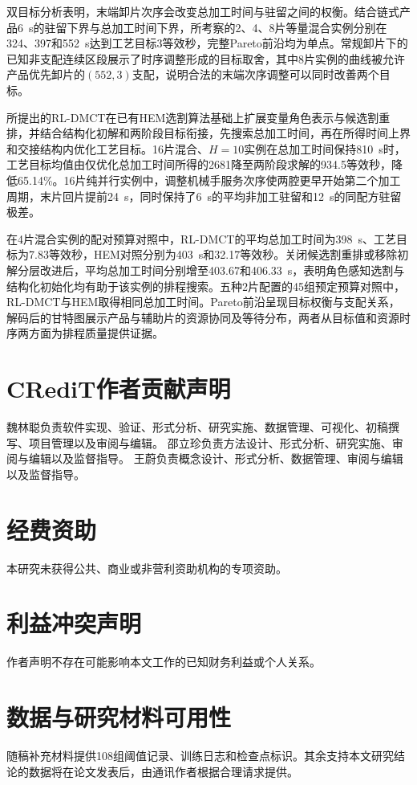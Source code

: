 \documentclass[final,5p,times,twocolumn]{elsarticle}
\begin{document}
双目标分析表明，末端卸片次序会改变总加工时间与驻留之间的权衡。结合链式产品6~s的驻留下界与总加工时间下界，所考察的2、4、8片等量混合实例分别在324、397和552~s达到工艺目标3等效秒，完整Pareto前沿均为单点。常规卸片下的已知非支配连续区段展示了时序调整形成的目标取舍，其中8片实例的曲线被允许产品优先卸片的$(552,3)$支配，说明合法的末端次序调整可以同时改善两个目标。

所提出的RL-DMCT在已有HEM选割算法基础上扩展变量角色表示与候选割重排，并结合结构化初解和两阶段目标衔接，先搜索总加工时间，再在所得时间上界和交接结构内优化工艺目标。16片混合、$H=10$实例在总加工时间保持810~s时，工艺目标均值由仅优化总加工时间所得的2681降至两阶段求解的934.5等效秒，降低65.14\%。16片纯并行实例中，调整机械手服务次序使两腔更早开始第二个加工周期，末片回片提前24~s，同时保持了6~s的平均非加工驻留和12~s的同配方驻留极差。

在4片混合实例的配对预算对照中，RL-DMCT的平均总加工时间为398~s、工艺目标为7.83等效秒，HEM对照分别为403~s和32.17等效秒。关闭候选割重排或移除初解分层改进后，平均总加工时间分别增至403.67和406.33~s，表明角色感知选割与结构化初始化均有助于该实例的排程搜索。五种2片配置的45组预定预算对照中，RL-DMCT与HEM取得相同总加工时间。Pareto前沿呈现目标权衡与支配关系，解码后的甘特图展示产品与辅助片的资源协同及等待分布，两者从目标值和资源时序两方面为排程质量提供证据。

\section*{CRediT作者贡献声明}
魏林聪负责软件实现、验证、形式分析、研究实施、数据管理、可视化、初稿撰写、项目管理以及审阅与编辑。
邵立珍负责方法设计、形式分析、研究实施、审阅与编辑以及监督指导。
王蔚负责概念设计、形式分析、数据管理、审阅与编辑以及监督指导。

\section*{经费资助}
本研究未获得公共、商业或非营利资助机构的专项资助。

\section*{利益冲突声明}
作者声明不存在可能影响本文工作的已知财务利益或个人关系。

\section*{数据与研究材料可用性}
随稿补充材料提供108组阈值记录、训练日志和检查点标识。其余支持本文研究结论的数据将在论文发表后，由通讯作者根据合理请求提供。
\end{document}
